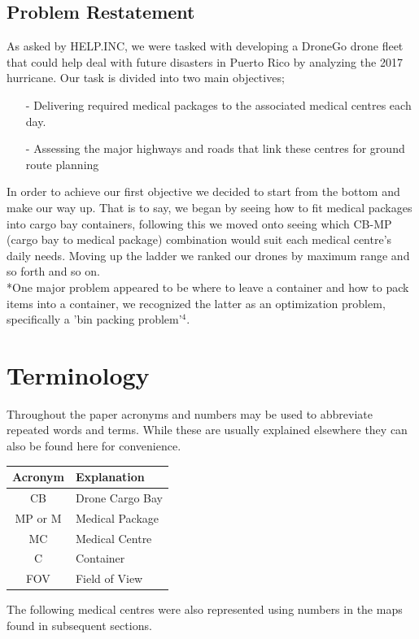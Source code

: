 \documentclass[a4paper,12pt]{article}
\begin{document}
\subsection{Problem Restatement}
As asked by HELP.INC, we were tasked with developing a DroneGo drone fleet that could help deal with future disasters in
Puerto Rico by analyzing the 2017 hurricane. Our task is divided into two main objectives;
\begin{itemize}
\item[-]Delivering required medical packages to the associated medical centres each day.
\item[-]Assessing the major highways and roads that link these centres for ground route planning
\end{itemize}
In order to achieve our first objective we decided to start from the bottom and make our way up. That is to say, we began by seeing how to fit medical packages into cargo bay containers, following this
we moved onto seeing which CB-MP (cargo bay to medical package) combination would suit each medical centre's daily needs. Moving up the ladder we ranked our drones by maximum range and so forth and so on.
\\*One major problem appeared to be where to leave a container and how to pack items into a container, we recognized the latter as an optimization problem, specifically a 'bin packing problem'$^4$.

\section{Terminology}
Throughout the paper acronyms and numbers may be used to abbreviate repeated words and terms. While these are usually explained elsewhere they can also be found here for convenience.

\begin{center}
\begin{tabular}{ |c|l| }
\hline
 \bf{Acronym} & \bf{Explanation}  \\\hline
 CB & Drone Cargo Bay \\
 MP or M & Medical Package \\
 MC & Medical Centre\\
 C & Container \\
 FOV & Field of View \\
 \hline
\end{tabular}
\end{center}
The following medical centres were also represented using numbers in the maps found in subsequent sections.
\end{document}
